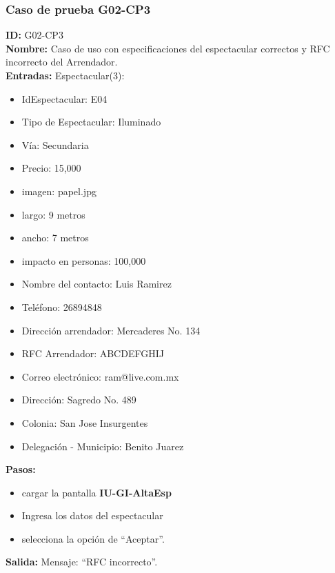 \subsubsection{Caso de prueba G02-CP3}
\textbf{ID:} G02-CP3\\
\textbf{Nombre:} Caso de uso con especificaciones del espectacular correctos y RFC incorrecto del Arrendador.\\
\textbf{Entradas:} 
Espectacular(3):
\begin{itemize}
    \item IdEspectacular: E04
    \item Tipo de Espectacular: Iluminado
    \item Vía: Secundaria
    \item Precio: 15,000
    \item imagen: papel.jpg
    \item largo: 9 metros
    \item ancho: 7 metros
    \item impacto en personas: 100,000
    \item Nombre del contacto: Luis Ramirez
    \item Teléfono: 26894848
    \item Dirección arrendador: Mercaderes No. 134
    \item RFC Arrendador: ABCDEFGHIJ
    \item Correo electrónico: ram@live.com.mx
    \item Dirección: Sagredo No. 489
    \item Colonia: San Jose Insurgentes
    \item Delegación - Municipio: Benito Juarez
\end{itemize} 
\textbf{Pasos:}
\begin{itemize}
\item cargar la pantalla \textbf{IU-GI-AltaEsp}
    \item Ingresa los datos del espectacular
    \item selecciona la opción de ``Aceptar''.
\end{itemize}
\textbf{Salida:}
Mensaje: ``RFC incorrecto''.

